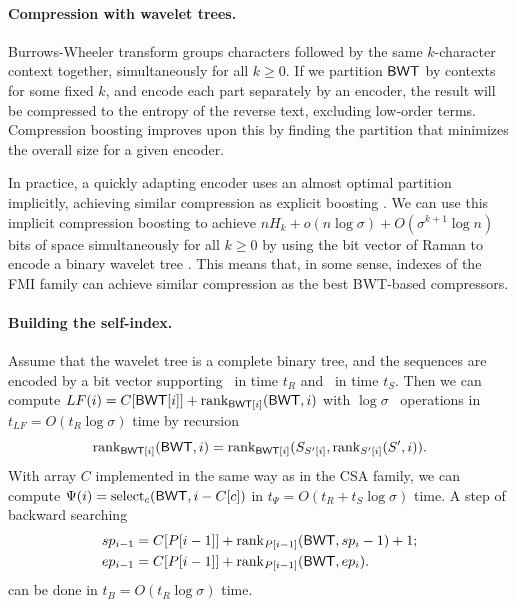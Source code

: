 \paragraph{Compression with wavelet trees.}

Burrows-Wheeler transform groups characters followed by the same $k$-character context together, simultaneously for all $k \ge 0$. If we partition $\mathsf{BWT}$ by  contexts for some fixed $k$, and encode each part separately by an  encoder, the result will be compressed to the  entropy of the reverse text, excluding low-order terms. Compression boosting \cite{Ferragina2005} improves upon this by finding the partition that minimizes the overall size for a given  encoder.

In practice, a quickly adapting  encoder uses an almost optimal partition implicitly, achieving similar compression as explicit boosting \cite{Ferragina2006a}. We can use this implicit compression boosting to achieve $nH_{k} + o(n \log \sigma) + O(\sigma^{k+1} \log n)$ bits of space simultaneously for all $k \ge 0$ by using the bit vector of Raman  to encode a binary wavelet tree \cite{Maekinen2008a}. This means that, in some sense, indexes of the FMI family can achieve similar compression as the best BWT-based compressors.

\paragraph{Building the self-index.}

Assume that the wavelet tree is a complete binary tree, and the sequences are encoded by a bit vector supporting
\rank\ in time $t_{R}$ and \select\ in time $t_{S}$. Then we can compute $LF(i) = C[\mathsf{BWT}[i]] + \operatorname{rank}_{\mathsf{BWT}[i]}(\mathsf{BWT},i)$  with $\log \sigma$ \rank\ operations in $t_{LF} = O(t_{R} \log \sigma)$ time by recursion
$$
\operatorname{rank}_{\mathsf{BWT}[i]}(\mathsf{BWT},i) = \operatorname{rank}_{\mathsf{BWT}[i]}(S_{S'[i]}, \operatorname{rank}_{S'[i]}(S',i)).
$$
With array $C$ implemented in the same way as in the CSA family, we can compute $\Psi(i) = \operatorname{select}_{c}(\mathsf{BWT}, i - C[c])$ in $t_{\Psi} = O(t_{R} + t_{S} \log \sigma)$ time. A step of backward searching
\begin{align*}
sp_{i-1} & = C[P[i-1]] + \operatorname{rank}_{P[i-1]}(\mathsf{BWT}, sp_{i}-1) + 1; \\
ep_{i-1} & = C[P[i-1]] + \operatorname{rank}_{P[i-1]}(\mathsf{BWT}, ep_{i}).
\end{align*}
can be done in $t_{B} = O(t_{R} \log \sigma)$ time.

